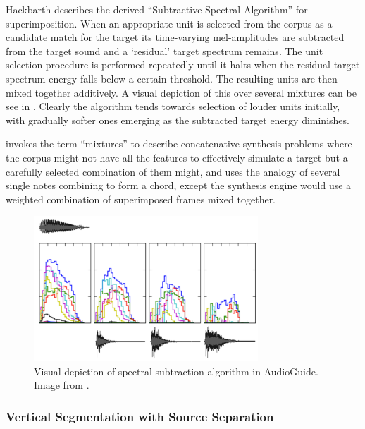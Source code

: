 {{Hackbarth \citep{Hackbarth2010} describes the derived ``Subtractive Spectral Algorithm'' for superimposition. When an appropriate unit is selected from the corpus as a candidate match for the target its time-varying mel-amplitudes are subtracted from the target sound and a `residual' target spectrum remains. The unit selection procedure is performed repeatedly until it halts when the residual target spectrum energy falls below a certain threshold. The resulting units are then mixed together additively. A visual depiction of this over several mixtures can be see in . Clearly the algorithm tends towards selection of louder units initially, with gradually softer ones emerging as the subtracted target energy diminishes. 

\citep{Coleman2015} invokes the term ``mixtures'' to describe concatenative synthesis problems where the corpus might not have all the features to effectively simulate a target but a carefully selected combination of them might, and uses the analogy of several single notes combining to form a chord, except the synthesis engine would use a weighted combination of superimposed frames mixed together.

\begin{figure}
	\begin{center}
		\includegraphics[width=0.75\textwidth]{ch05_pyconcat/figures/spectrum_subtraction}
	\end{center}
	\caption[Spectral Subtraction Algorithm in AudioGuide]{Visual depiction of spectral subtraction algorithm in AudioGuide. Image from \cite{Hackbarth2010}.}
	\label{fig:spectrum_subtraction}
\end{figure} 

\subsubsection{Vertical Segmentation with Source Separation}

}}
